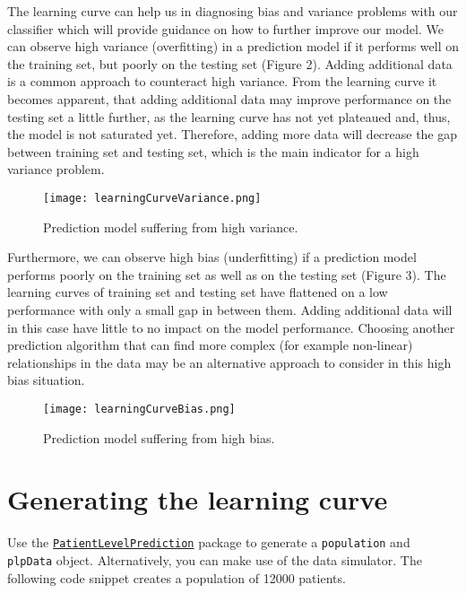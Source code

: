 \documentclass[]{article}
\begin{document}
The learning curve can help us in diagnosing bias and variance problems
with our classifier which will provide guidance on how to further
improve our model. We can observe high variance (overfitting) in a
prediction model if it performs well on the training set, but poorly on
the testing set (Figure 2). Adding additional data is a common approach
to counteract high variance. From the learning curve it becomes
apparent, that adding additional data may improve performance on the
testing set a little further, as the learning curve has not yet
plateaued and, thus, the model is not saturated yet. Therefore, adding
more data will decrease the gap between training set and testing set,
which is the main indicator for a high variance problem.

\begin{figure}
\centering
\texttt{[image: learningCurveVariance.png]}
\caption{Prediction model suffering from high variance.}
\end{figure}

Furthermore, we can observe high bias (underfitting) if a prediction
model performs poorly on the training set as well as on the testing set
(Figure 3). The learning curves of training set and testing set have
flattened on a low performance with only a small gap in between them.
Adding additional data will in this case have little to no impact on the
model performance. Choosing another prediction algorithm that can find
more complex (for example non-linear) relationships in the data may be
an alternative approach to consider in this high bias situation.

\begin{figure}
\centering
\texttt{[image: learningCurveBias.png]}
\caption{Prediction model suffering from high bias.}
\end{figure}

\section{Generating the learning
curve}\label{generating-the-learning-curve}

Use the
\href{http://github.com/OHDSI/PatientLevelPrediction}{\texttt{PatientLevelPrediction}}
package to generate a \texttt{population} and \texttt{plpData} object.
Alternatively, you can make use of the data simulator. The following
code snippet creates a population of 12000 patients.
\end{document}

